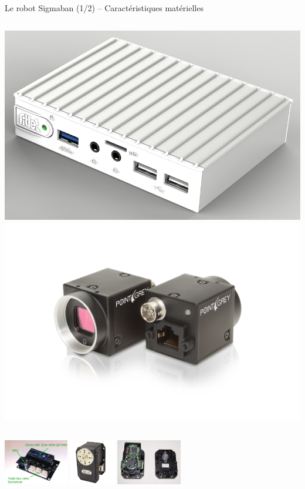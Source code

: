 \begin{frame}{Le robot Sigmaban (1/2) -- Caractéristiques matérielles}
\begin{columns}
\begin{column}{0.6\linewidth}
\begin{columns}
\begin{column}{0.6\linewidth}
                    \newline
                    \includegraphics[width=0.5\linewidth]{../media/fitlet.jpg}
                    \includegraphics[width=0.6\linewidth]{../media/camera_blackfly.jpg}
                \end{column}
            \end{columns}
            \includegraphics[type=pdf,ext=.pdf,read=.pdf,height=2cm]{../schema/3bus}
            \includegraphics[height=2cm]{../media/dynamixel1.jpg}
            \includegraphics[height=2cm]{../media/dynamixel2.jpg}
        \end{column}
    \end{columns}
\end{frame}

